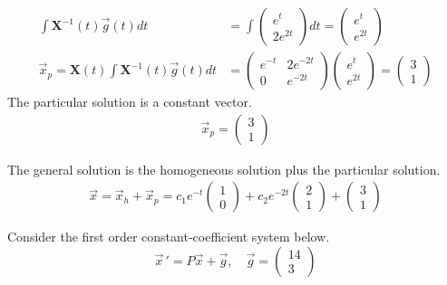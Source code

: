 {\begin{align}
    \int \mathbf{X} ^ {-1} (t) \vec{g}(t) dt &= \int \begin{pmatrix} e^t \\ 2e^{2t}\end{pmatrix} dt = \begin{pmatrix} e^t \\ e^{2t} \end{pmatrix} \\
    \vec x_p = \mathbf{X}(t) \int \mathbf{X} ^ {-1} (t) \vec{g}(t) dt &= \begin{pmatrix} 
    e ^ {-t} & 2e ^ {-2t}\\ 0 &   e ^ {-2t} \end{pmatrix} \begin{pmatrix} e^t \\ e^{2t} \end{pmatrix} = \begin{pmatrix} 3 \\ 1 \end{pmatrix}
\end{align}
The particular solution is a constant vector. 
\begin{align}
    \vec x_p =  \begin{pmatrix} 3 \\ 1 \end{pmatrix}
\end{align}

The general solution is the homogeneous solution plus the particular solution. 
\begin{align}
    \vec x = \vec x_h + \vec x_p = c_1e^{-t}\begin{pmatrix}1\\0\end{pmatrix} + c_2e^{-2t}\begin{pmatrix}2\\1\end{pmatrix} + \begin{pmatrix} 3\\1\end{pmatrix}
\end{align}

    } 
   \else
   \fi

\fi 





\ifnum {}
\ifnum {} \newpage \fi
\question[5] Consider the first order constant-coefficient system below. 
\[\vec{x}\, ' = P\vec {x} + \vec g, \quad \vec g = \begin{pmatrix} 14\\3\end{pmatrix}\] 

